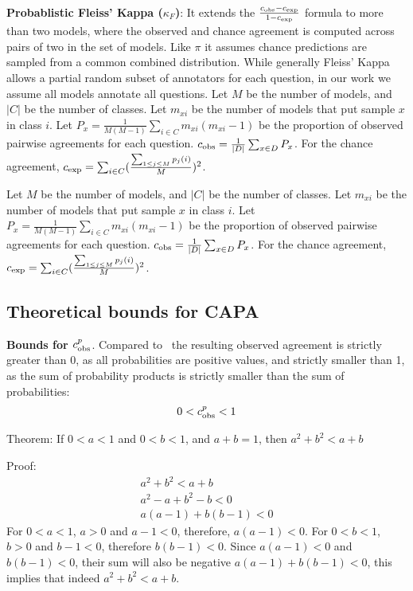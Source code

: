\textbf{Probablistic Fleiss' Kappa ($\kappa_F$)}: It extends the $\frac{c_{\text{obs}} - c_{\text{exp}}}{1 - c_{\text{exp}}}$ formula to more than two models, where the observed and chance agreement is computed across pairs of two in the set of models. Like $\pi$ it assumes chance predictions are sampled from a common combined distribution. While generally Fleiss' Kappa allows a partial random subset of annotators for each question, in our work we assume all models annotate all questions. Let $M$ be the number of models, and $|C|$ be the number of classes. Let $m_{xi}$ be the number of models that put sample $x$ in class $i$. Let $P_x = \frac{1}{M(M-1)} \sum_{i \in C} m_{xi}(m_{xi}-1)$ be the proportion of observed pairwise agreements for each question. $c_{\text{obs}} = \frac{1}{|D|}\sum_{x \in D} P_x$. For the chance agreement, $c_{\text{exp}} = \sum_{i \in C} (\frac{\sum_{1 \leq j \leq M} p_j(i)}{M})^2$.

Let $M$ be the number of models, and $|C|$ be the number of classes. Let $m_{xi}$ be the number of models that put sample $x$ in class $i$. Let $P_x = \frac{1}{M(M-1)} \sum_{i \in C} m_{xi}(m_{xi}-1)$ be the proportion of observed pairwise agreements for each question. $c_{\text{obs}} = \frac{1}{|D|}\sum_{x \in D} P_x$. For the chance agreement, $c_{\text{exp}} = \sum_{i \in C} (\frac{\sum_{1 \leq j \leq M} p_j(i)}{M})^2$.

\subsection{Theoretical bounds for CAPA}
\label{app:goelpi_bounds}

\textbf{Bounds for $c_{\text{obs}}^{p}$}. Compared to~\citet{geirhos2020beyond} the resulting observed agreement is strictly greater than 0, as all probabilities are positive values, and strictly smaller than 1, as the sum of probability products is strictly smaller than the sum of probabilities:
\begin{align}
    0 < c_{\text{obs}}^{p} < 1 
\end{align}

Theorem:
If $0<a<1$ and $0<b<1$, and $a+b=1$, then $a^{2} + b^{2} < a+b$ 

Proof:
\begin{align*}
    a^{2} + b^{2} < a+b \\
    a^{2} -a + b^{2} -b  < 0 \\
    a(a-1) + b(b-1) <0 
\end{align*}
For $0<a<1$, $a>0$ and $a-1 <0 $, therefore, $a(a-1)<0$. For $0<b<1$, $b>0$ and $b-1<0$, therefore $b(b-1)<0$. Since $a(a-1)<0$ and $b(b-1)<0$, their sum will also be negative $a(a-1) + b(b-1) <0$,
this implies that indeed $a^{2} + b^{2} < a+b$. 

